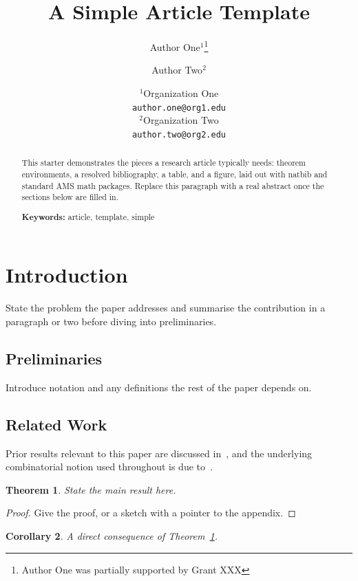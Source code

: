 \documentclass[a4paper]{article}
\title{A Simple Article Template}
\author{Author One$^1$\thanks{Author One was partially supported by Grant XXX} \and Author Two$^2$}
\date{
	$^1$Organization One \\ \texttt{author.one@org1.edu}\\%
	$^2$Organization Two \\ \texttt{author.two@org2.edu}\\[2ex]%
}
\theoremstyle{plain}
\newtheorem{theorem}{Theorem}
\newtheorem{corollary}[theorem]{Corollary}
\theoremstyle{definition}
\begin{document}
	\maketitle

	\begin{abstract}
		This starter demonstrates the pieces a research article
		typically needs: theorem environments, a resolved
		bibliography, a table, and a figure, laid out with natbib
		and standard AMS math packages. Replace this paragraph
		with a real abstract once the sections below are filled in.

		\noindent\textbf{Keywords:} article, template, simple
	\end{abstract}

	\tableofcontents

	\section{Introduction}
	\label{sec:intro}

	State the problem the paper addresses and summarise the
	contribution in a paragraph or two before diving into
	preliminaries.

	\subsection{Preliminaries}
	\label{sec:pre}

	Introduce notation and any definitions the rest of the paper
	depends on.

	\subsection{Related Work}
	\label{sec:related}

	Prior results relevant to this paper are discussed
	in~\citep{HararyR74}, and the underlying combinatorial notion
	used throughout is due to~\citep{Berge57,Berge58}.

	\begin{theorem}
		\label{thrm:1}
		State the main result here.
	\end{theorem}
	\begin{proof}
		Give the proof, or a sketch with a pointer to the appendix.
	\end{proof}

	\begin{corollary}
	\label{cor:1}
	A direct consequence of Theorem~\ref{thrm:1}.
	\end{corollary}
\end{document}
